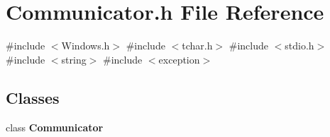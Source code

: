 \section{Communicator.\+h File Reference}
\label{_communicator_8h}
{\ttfamily \#include $<$Windows.\+h$>$}\newline
{\ttfamily \#include $<$tchar.\+h$>$}\newline
{\ttfamily \#include $<$stdio.\+h$>$}\newline
{\ttfamily \#include $<$string$>$}\newline
{\ttfamily \#include $<$exception$>$}\newline
\subsection*{Classes}
\begin{DoxyCompactItemize}
\item 
class \textbf{ Communicator}
\end{DoxyCompactItemize}
